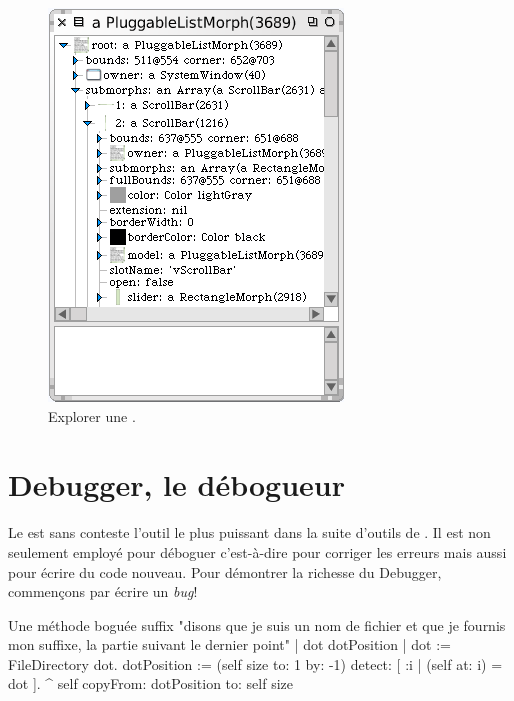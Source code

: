 \documentclass[a4paper,10pt,twoside]{book}
\begin{document}
\begin{figure}[tbp]
	\begin{center}
		\includegraphics[scale=0.7]{explorePluggableListMorph}
	\end{center}
	\caption{Explorer une .}
	\label{fig:explorePluggableListMorph}
\end{figure}

\section{Debugger, le d\'ebogueur}
\label{sec:debugger} %

Le   est sans conteste l'outil le plus
puissant dans la suite d'outils de \pharo. 
Il est non seulement employ\'e pour d\'eboguer c'est-à-dire pour corriger les erreurs
mais aussi pour \'ecrire du code nouveau.
Pour d\'emontrer la richesse du Debugger, commen\c{c}ons par
\'ecrire un \emph{bug}!


\needspace{10ex}
\begin{method}[buggy]{Une m\'ethode bogu\'ee}
suffix
	"disons que je suis un nom de fichier et que je fournis mon suffixe, la partie suivant le dernier point"
	| dot dotPosition |
	dot := FileDirectory dot.
	dotPosition := (self size to: 1 by: -1) detect: [ :i | (self at: i) = dot ].
	^ self copyFrom: dotPosition to: self size 
\end{method}
\end{document}
